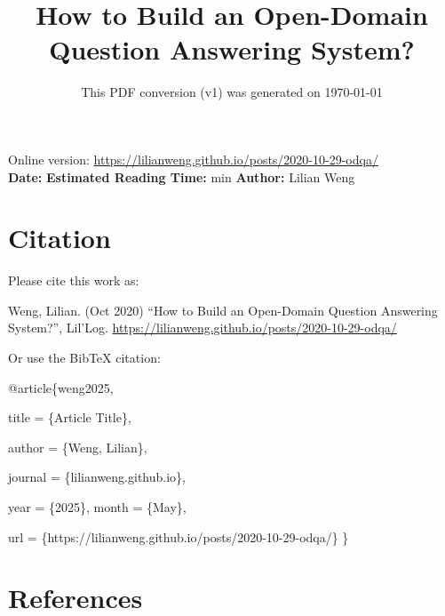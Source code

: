 \documentclass[12pt]{article}
\title{How to Build an Open-Domain Question Answering System?}
\date{This PDF conversion (v1) was generated on \today\footnotemark}
\begin{document}
\maketitle
\begin{center}
    Online version: \url{https://lilianweng.github.io/posts/2020-10-29-odqa/} \\
    \textbf{Date:} \quad
    \textbf{Estimated Reading Time:}  min \quad
    \textbf{Author:} Lilian Weng
\end{center}




\newpage
\tableofcontents
\newpage
\vspace{1em}
\n\n\n\section{Citation}
Please cite this work as:

\begin{tcolorbox}[colback=black!5!white, colframe=black!80!white, boxrule=0.5pt, arc=2mm, left=1mm, right=1mm, top=1mm, bottom=1mm]
  Weng, Lilian. (Oct 2020) ``How to Build an Open-Domain Question Answering System?'', Lil'Log. \url{https://lilianweng.github.io/posts/2020-10-29-odqa/}
  \end{tcolorbox}

Or use the BibTeX citation:

\begin{tcolorbox}[
    colback=black!5!white,
    colframe=black!80!white,
    boxrule=0.5pt,
    arc=2mm,
    left=1mm,
    right=1mm,
    top=1mm,
    bottom=1mm,
    listing only,
    listing options={
      basicstyle=\ttfamily\footnotesize,
      breaklines=true,
      literate={\{}{{\char`\{}}1 {\}}{{\char`\}}}1
    }
  ]
  @article\{weng2025,

    title   = \{Article Title\},

    author  = \{Weng, Lilian\},

    journal = \{lilianweng.github.io\},

    year    = \{2025\},
    month   = \{May\},

    url     = \{https://lilianweng.github.io/posts/2020-10-29-odqa/\}\n
  \}
  \end{tcolorbox}

\newpage
\section{References}

\n
\end{document}
